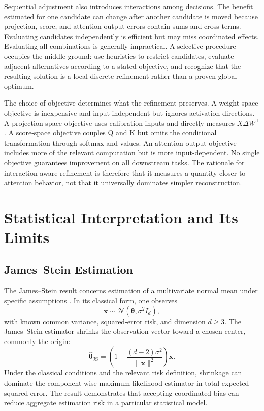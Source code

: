 Sequential adjustment also introduces interactions among decisions. The benefit estimated for one candidate can change after another candidate is moved because projection, score, and attention-output errors contain sums and cross terms. Evaluating candidates independently is efficient but may miss coordinated effects. Evaluating all combinations is generally impractical. A selective procedure occupies the middle ground: use heuristics to restrict candidates, evaluate adjacent alternatives according to a stated objective, and recognize that the resulting solution is a local discrete refinement rather than a proven global optimum.

The choice of objective determines what the refinement preserves. A weight-space objective is inexpensive and input-independent but ignores activation directions. A projection-space objective uses calibration inputs and directly measures $X\Delta W^\top$. A score-space objective couples Q and K but omits the conditional transformation through softmax and values. An attention-output objective includes more of the relevant computation but is more input-dependent. No single objective guarantees improvement on all downstream tasks. The rationale for interaction-aware refinement is therefore that it measures a quantity closer to attention behavior, not that it universally dominates simpler reconstruction.

\section{Statistical Interpretation and Its Limits}

\subsection{James--Stein Estimation}

The James--Stein result concerns estimation of a multivariate normal mean under specific assumptions \cite{james1961estimation}. In its classical form, one observes
\begin{equation}
\mathbf{x}\sim\mathcal{N}(\boldsymbol{\theta},\sigma^2I_d),
\end{equation}
with known common variance, squared-error risk, and dimension $d\geq3$. The James--Stein estimator shrinks the observation vector toward a chosen center, commonly the origin:
\begin{equation}
\hat{\boldsymbol{\theta}}_{\mathrm{JS}}
=
\left(
1-\frac{(d-2)\sigma^2}{\|\mathbf{x}\|^2}
\right)\mathbf{x}.
\end{equation}
Under the classical conditions and the relevant risk definition, shrinkage can dominate the component-wise maximum-likelihood estimator in total expected squared error. The result demonstrates that accepting coordinated bias can reduce aggregate estimation risk in a particular statistical model.

